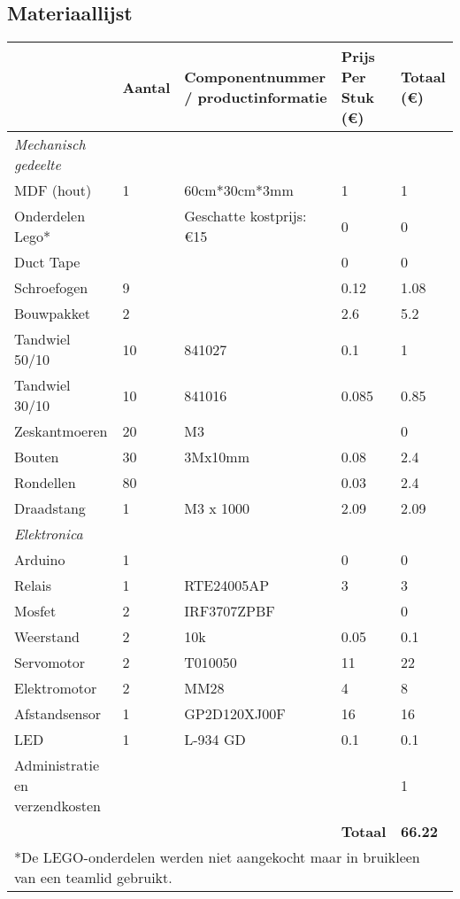 \subsection{Materiaallijst}
\label{bijlage:materiaallijst}
\FloatBarrier
\begin{center}
\begin{table}
\begin{tabular}{| p{3cm} | l | p{3cm} | p{2cm} | p{2cm}|}
\hline
& \textbf{Aantal} & \textbf{Component\-nummer / product\-informatie} & 
\textbf{Prijs Per Stuk (\euro)} & \textbf{Totaal (\euro)}\\\hline
\emph{Mechanisch gedeelte} &  &  &  & \\\hline
MDF (hout) & 1 & 60cm*30cm*3mm & 1 & 1\\\hline
Onderdelen Lego* &  & Geschatte kostprijs: \euro15 & 0 & 0\\\hline
Duct Tape &  &  & 0 & 0\\\hline
Schroefogen & 9 &  & 0.12 & 1.08\\\hline
Bouwpakket & 2 &  & 2.6 & 5.2\\\hline
Tandwiel 50/10 & 10 & 841027 & 0.1 & 1\\\hline
Tandwiel 30/10 & 10 & 841016 & 0.085 & 0.85\\\hline
Zeskantmoeren & 20 & M3 &  & 0\\\hline
Bouten & 30 & 3Mx10mm & 0.08 & 2.4\\\hline
Rondellen & 80 &  & 0.03 & 2.4\\\hline
Draadstang & 1 & M3 x 1000 & 2.09 & 2.09\\\hline
\emph{Elektronica} &  &  &  & \\\hline
Arduino & 1 &  & 0 & 0\\\hline
Relais & 1 & RTE24005AP & 3 & 3\\\hline
Mosfet & 2 & IRF3707ZPBF &  & 0\\\hline
Weerstand & 2 & 10k & 0.05 & 0.1\\\hline
Servomotor & 2 & T010050 & 11 & 22\\\hline
Elektromotor & 2 & MM28 & 4 & 8\\\hline
Afstandsensor & 1 & GP2D120XJ00F & 16 & 16\\\hline
LED & 1 & L-934 GD & 0.1 & 0.1\\\hline
Administratie en verzendkosten &  &  &  & 1\\\hline
 &  &  & \textbf{Totaal} & \textbf{66.22}\\\hline
 \multicolumn{5}{l}{*De LEGO-onderdelen werden niet aangekocht maar in bruikleen 
van een teamlid gebruikt.}\\
 

\end{tabular}
\end{table}
\end{center}
